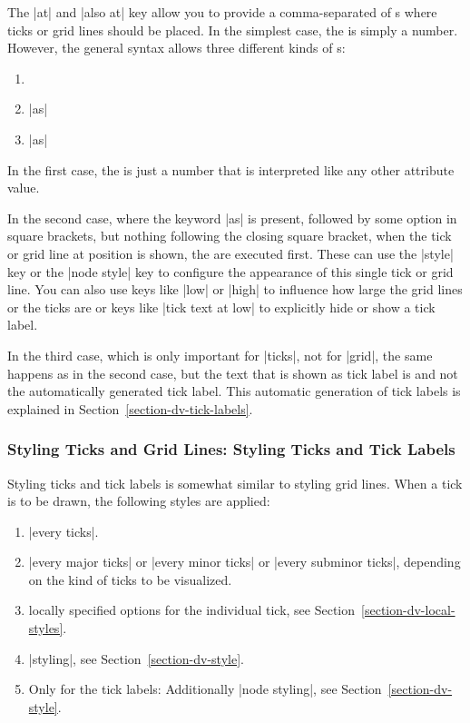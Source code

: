 \label{section-dv-local-styles}

The |at| and |also at| key allow you to provide a comma-separated
 of s where ticks or grid lines should be
placed. In the simplest case, the  is simply a
number. However, the general syntax allows three different kinds of
s: 

\begin{enumerate}
\item
\item
   |as|  
\item
   |as|  
\end{enumerate}

In the first case, the  is just a number that is
interpreted like any other attribute value.

In the second case, where the keyword |as| is present, followed by
some option in square brackets, but nothing following the closing
square bracket, when the tick or grid line at position  is
shown, the  are executed first. These can use the
|style| key or the |node style| key to configure the appearance of
this single tick or grid line. You can also use keys like |low| or
|high| to influence how large the grid lines or the ticks are or keys
like |tick text at low| to explicitly hide or show a tick label.

In the third case, which is only important for |ticks|, not for
|grid|, the same happens as in the second case, but the 
text that is shown as tick label is  and not the
automatically generated tick label. This automatic generation of tick
labels is explained in Section~\ref{section-dv-tick-labels}.


\subsubsection{Styling Ticks and Grid Lines: Styling Ticks and Tick Labels}

Styling ticks and tick labels is somewhat similar to styling grid
lines. When a tick is to be drawn, the following styles are applied:

\begin{enumerate}
\item
  |every ticks|.
\item |every major ticks| or |every minor ticks| or
  |every subminor ticks|, depending on the kind of ticks to be
  visualized. 
\item
  locally specified options for the individual tick, see
  Section~\ref{section-dv-local-styles}. 
\item
  |styling|, see Section~\ref{section-dv-style}.
\item
  Only for the tick labels: Additionally |node styling|, see Section~\ref{section-dv-style}.
\end{enumerate}

